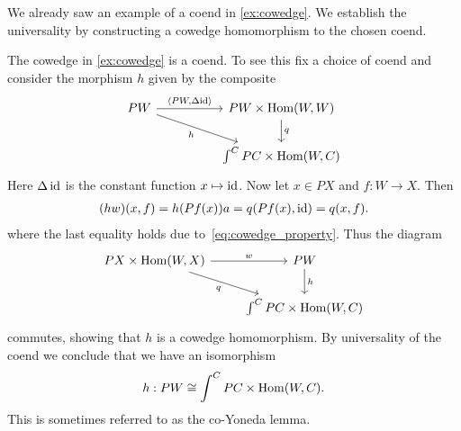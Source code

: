 We already saw an example of a coend in \ref{ex:cowedge}. We establish the
universality by constructing a cowedge homomorphism to the chosen coend.

\begin{example}\label{ex:coend}
  The cowedge in \ref{ex:cowedge} is a coend. To see this fix a choice of coend and
  consider the morphism $h$ given by the composite
  \begin{equation}
    \begin{tikzcd}
      PW && {PW\times\text{Hom}(W,W)} \\
         && {\int^{C} PC\times\text{Hom}(W,C)}
         \arrow["{\langle PW,\Delta\text{id}\rangle}", from=1-1, to=1-3]
         \arrow["q", from=1-3, to=2-3]
         \arrow["h"', from=1-1, to=2-3]
    \end{tikzcd}
  \end{equation}
  Here $\Delta\operatorname{id}$ is the constant function $x\mapsto \operatorname{id}$.
  Now let $x\in PX$ and $f:W\to X$. Then
  \begin{align*}
    (h w)(x,f) = h(Pf(x))a = q(Pf(x),\operatorname{id}) = q(x,f).
  \end{align*}
  where the last equality holds due to~\ref{eq:cowedge_property}.
  Thus the diagram
  \begin{equation*}
    \begin{tikzcd}
      {PX\times\text{Hom}(W,X)} & PW \\
                                & {\int^C PC\times\text{Hom}(W,C)}
                                \arrow["h", from=1-2, to=2-2]
                                \arrow["w", from=1-1, to=1-2]
                                \arrow["q"', from=1-1, to=2-2]
    \end{tikzcd}
  \end{equation*}
  commutes, showing that $h$ is a cowedge homomorphism. By universality of the coend we conclude
  that we have an isomorphism
  \begin{align*}
    h:PW\cong \int^C PC\times\operatorname{Hom}(W,C).
  \end{align*}
  This is sometimes referred to as the co-Yoneda lemma.
\end{example}

